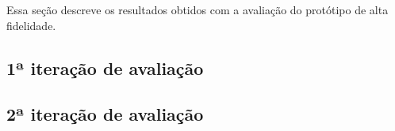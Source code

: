     Essa seção descreve os resultados obtidos com a avaliação do protótipo de alta fidelidade.
    
    \subsection{1ª iteração de avaliação}
      
	
	
  
      \pagebreak
      
      \subsection{2ª iteração de avaliação}
	
	
  
      \pagebreak
      
      
    

